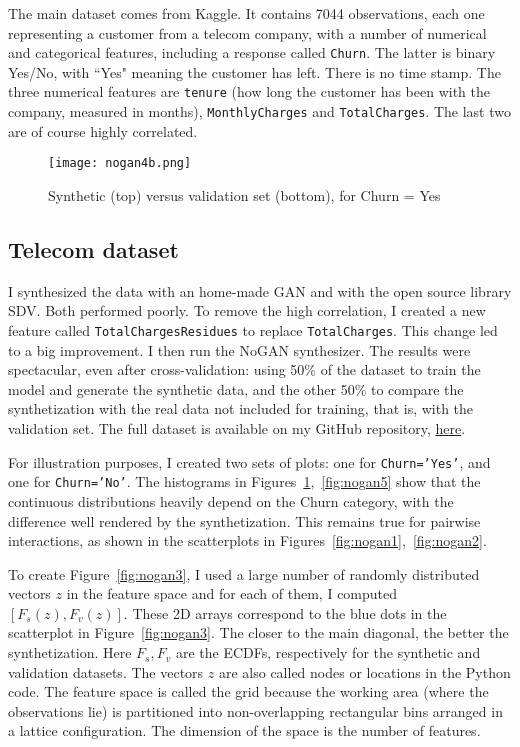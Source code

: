 \documentclass[oneside,10pt]{book}
\begin{document}
The main dataset comes from Kaggle. It contains 7044 observations, each one representing a customer from a telecom company,
 with a number of numerical and categorical features, including a response called \texttt{Churn}. The latter is binary Yes/No, with ``Yes" meaning the customer has left.
 There is no time stamp. The three numerical features are \texttt{tenure} (how long the customer has been with the company, measured in months), \texttt{MonthlyCharges} and \texttt{TotalCharges}. The last two are of course highly correlated.

\begin{figure}[H]
\centering
\texttt{[image: nogan4b.png]} %
\caption{Synthetic (top) versus validation set (bottom), for Churn = Yes}
\label{fig:nogan4}
\end{figure}



\subsection{Telecom dataset}

I synthesized the data with an home-made GAN and with the open source library SDV. Both performed poorly. To remove the high correlation, I created a new feature called \texttt{TotalChargesResidues} to replace \texttt{TotalCharges}. This change led to a big improvement. I then
 run the NoGAN synthesizer. The results were spectacular, even after cross-validation: using 50\% of the dataset to train the model and generate the synthetic data, and the other 50\%
 to compare the synthetization with the real data not included for training, that is,  with the \textcolor{index}{validation set}. The full dataset is available on my GitHub repository, \href{https://github.com/VincentGranville/Main/blob/main/Telecom.csv}{here}.





For illustration purposes, I created two sets of plots: one for \texttt{Churn='Yes'}, and one for \texttt{Churn='No'}.
The histograms in Figures~\ref{fig:nogan4},~\ref{fig:nogan5} show that the continuous distributions heavily depend on the Churn category, with the difference well rendered by the synthetization. This remains true for pairwise interactions, as shown in the scatterplots
 in Figures~\ref{fig:nogan1},~\ref{fig:nogan2}.

To create Figure~\ref{fig:nogan3}, I used a large number of randomly distributed vectors  $z$ in the feature space and for each of them, I computed $[F_s(z), F_v(z)]$. These 2D arrays correspond to the blue dots in the scatterplot in Figure~\ref{fig:nogan3}. The closer to the main diagonal, the better the synthetization. Here $F_s, F_v$ are the ECDFs, respectively for the synthetic and validation datasets.
The vectors $z$ are also called nodes or locations in the Python code.  The feature space is called the grid because the working area (where the observations lie) is partitioned into non-overlapping rectangular bins arranged in a lattice configuration. The dimension of the space is the number of features.
\end{document}
